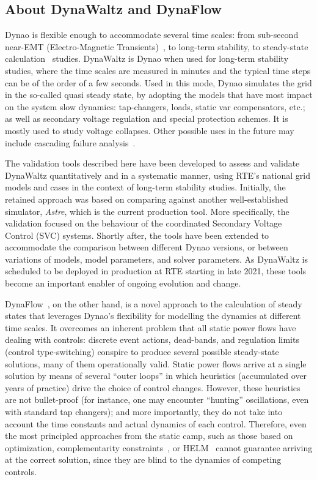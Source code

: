 \documentclass[conference]{IEEEtran}
\newcommand{\Dynawo}{Dyna\textomega o} %
\begin{document}
\subsection{About DynaWaltz and DynaFlow}

\Dynawo{} is flexible enough to accommodate several time scales: from sub-second
near-EMT (Electro-Magnetic Transients)~\cite{Masoon21}, to long-term stability,
to steady-state calculation~\cite{Cossart21} studies. DynaWaltz is \Dynawo{}
when used for long-term stability studies, where the time scales are measured in
minutes and the typical time steps can be of the order of a few seconds. Used in
this mode, \Dynawo{} simulates the grid in the so-called quasi steady state, by
adopting the models that have most impact on the system slow dynamics:
tap-changers, loads, static var compensators, etc.; as well as secondary voltage
regulation and special protection schemes. It is mostly used to study voltage
collapses. Other possible uses in the future may include cascading failure
analysis~\cite{Bialek16}.

The validation tools described here have been developed to assess and validate
DynaWaltz quantitatively and in a systematic manner, using RTE's national grid
models and cases in the context of long-term stability studies. Initially, the
retained approach was based on comparing against another well-established
simulator, \emph{Astre}, which is the current production tool. More
specifically, the validation focused on the behaviour of the coordinated
Secondary Voltage Control (SVC) systems. Shortly after, the tools have been
extended to accommodate the comparison between different \Dynawo{} versions, or
between variations of models, model parameters, and solver parameters. As
DynaWaltz is scheduled to be deployed in production at RTE starting in late
2021, these tools become an important enabler of ongoing evolution and change.

DynaFlow~\cite{Cossart21}, on the other hand, is a novel approach to the
calculation of steady states that leverages \Dynawo's flexibility for modelling
the dynamics at different time scales. It overcomes an inherent problem that all
static power flows have dealing with controls: discrete event actions,
dead-bands, and regulation limits (control type-switching) conspire to produce
several possible steady-state solutions, many of them operationally valid.
Static power flows arrive at a single solution by means of several ``outer
loops'' in which heuristics (accumulated over years of practice) drive the
choice of control changes. However, these heuristics are not bullet-proof (for
instance, one may encounter ``hunting'' oscillations, even with standard tap
changers); and more importantly, they do not take into account the time
constants and actual dynamics of each control. Therefore, even the most
principled approaches from the static camp, such as those based on
optimization\cite{Ju20}, complementarity constraints~\cite{Murray15}, or
HELM~\cite{Trias18} cannot guarantee arriving at the correct solution, since
they are blind to the dynamics of competing controls.
\end{document}
